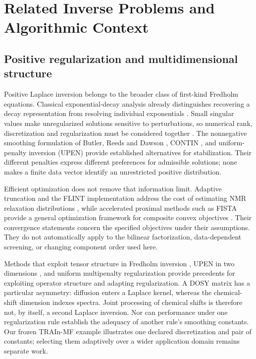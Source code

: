 \section{Related Inverse Problems and Algorithmic Context}\label{sec:related}
\subsection{Positive regularization and multidimensional structure}
Positive Laplace inversion belongs to the broader class of first-kind Fredholm equations. Classical exponential-decay analysis already distinguishes recovering a decay representation from resolving individual exponentials \cite{discrete}. Small singular values make unregularized solutions sensitive to perturbations, so numerical rank, discretization and regularization must be considered together \cite{hansen}. The nonnegative smoothing formulation of Butler, Reeds and Dawson \cite{brd}, CONTIN \cite{contin}, and uniform-penalty inversion (UPEN) \cite{upen} provide established alternatives for stabilization. Their different penalties express different preferences for admissible solutions; none makes a finite data vector identify an unrestricted positive distribution.

Efficient optimization does not remove that information limit. Adaptive truncation and the FLINT implementation address the cost of estimating NMR relaxation distributions \cite{flint}, while accelerated proximal methods such as FISTA provide a general optimization framework for composite convex objectives \cite{fista}. Their convergence statements concern the specified objectives under their assumptions. They do not automatically apply to the bilinear factorization, data-dependent screening, or changing component order used here.

Methods that exploit tensor structure in Fredholm inversion \cite{separable2d}, UPEN in two dimensions \cite{upen2d}, and uniform multipenalty regularization \cite{mupen} provide precedents for exploiting operator structure and adapting regularization. A DOSY matrix has a particular asymmetry: diffusion enters a Laplace kernel, whereas the chemical-shift dimension indexes spectra. Joint processing of chemical shifts is therefore not, by itself, a second Laplace inversion. Nor can performance under one regularization rule establish the adequacy of another rule's smoothing constants. Our frozen TRAIn-MF example illustrates one declared discretization and pair of constants; selecting them adaptively over a wider application domain remains separate work.

